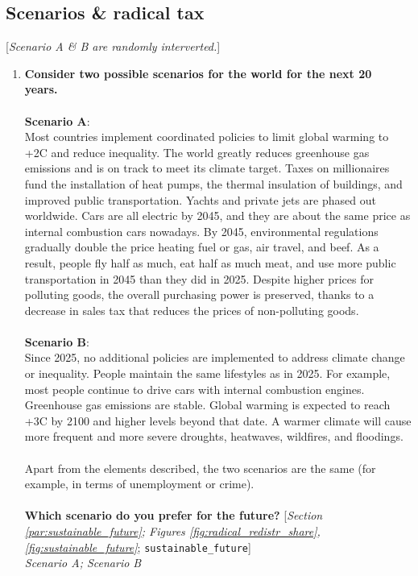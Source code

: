 \documentclass[12pt,english]{article}
\begin{document}
\begin{bibunit}
 \subsection*{Scenarios \& radical tax} 
 [\textit{Scenario A \& B are randomly interverted.}]
 \begin{enumerate}[resume] 
\item  \label{q:sustainable_future} \textbf{Consider two possible scenarios for the world for the next 20 years.~\\\\Scenario A}: \\Most countries implement coordinated policies to limit global warming to +2\textdegree{}C and reduce inequality. The world greatly reduces greenhouse gas emissions and is on track to meet its climate target. Taxes on millionaires fund the installation of heat pumps, the thermal insulation of buildings, and improved public transportation. Yachts and private jets are phased out worldwide. Cars are all electric by 2045, and they are about the same price as internal combustion cars nowadays. By 2045, environmental regulations gradually double the price heating fuel or gas, air travel, and beef. As a result, people fly half as much, eat half as much meat, and use more public transportation in 2045 than they did in 2025. Despite higher prices for polluting goods, the overall purchasing power is preserved, thanks to a decrease in sales tax that reduces the prices of non-polluting goods.\\\\\textbf{Scenario B}:\\Since 2025, no additional policies are implemented to address climate change or inequality. People maintain the same lifestyles as in 2025. For example, most people continue to drive cars with internal combustion engines. Greenhouse gas emissions are stable. Global warming is expected to reach +3\textdegree{}C by 2100 and higher levels beyond that date. A warmer climate will cause more frequent and more severe droughts, heatwaves, wildfires, and floodings.\\\\Apart from the elements described, the two scenarios are the same (for example, in terms of unemployment or crime). \\\\\textbf{Which scenario do you prefer for the future?} [\textit{Section \ref{par:sustainable_future}; Figures \ref{fig:radical_redistr_share}, \ref{fig:sustainable_future}}; 
\verb|sustainable_future|]
  \\ \textit{Scenario A; Scenario B} \\\\

\end{enumerate}
\end{bibunit}
\end{document}
